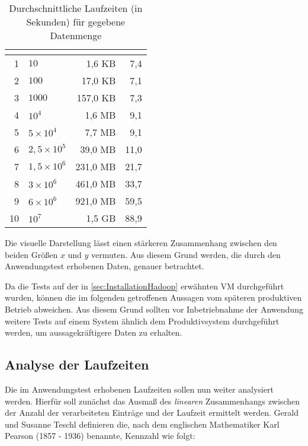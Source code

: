 \begin{table}
	\centering
	\begin{tabular}{| r | l | r | r |}
		\hline
		\rowcolor[HTML]{3531FF} 
		\multicolumn{1}{|l|}{\cellcolor[HTML]{4F88BB}{\color[HTML]{FFFFFF} {\bf \#}}} & \multicolumn{1}{l|}{\cellcolor[HTML]{4F88BB}{\color[HTML]{FFFFFF} {\bf Anzahl Einträge}}} & \multicolumn{1}{l|}{\cellcolor[HTML]{4F88BB}{\color[HTML]{FFFFFF} {\bf Dateigröße}}} & \multicolumn{1}{l|}{\cellcolor[HTML]{4F88BB}{\color[HTML]{FFFFFF} {\bf Laufzeit}}} \\ \hline
		1 & $10$ & 1,6 \ac{KB} & 7,4 \\  \hline
		2 & $100$ & 17,0 \ac{KB} & 7,1 \\ \hline
		3 & $1000$ & 157,0 \ac{KB} & 7,3 \\  \hline \hline
		4 & $10^4$ & 1,6 \ac{MB} & 9,1 \\  \hline
		5 & $5\times10^4$ & 7,7 \ac{MB} & 9,1 \\  \hline
		6 & $2,5\times10^5$ & 39,0 \ac{MB} & 11,0 \\  \hline
		7 & $1,5\times10^6$ & 231,0 \ac{MB} & 21,7 \\  \hline
		8 & $3\times10^6$ & 461,0 \ac{MB} & 33,7 \\  \hline
		9 & $6\times10^6$ & 921,0 \ac{MB} & 59,5 \\  \hline \hline
		10 & $10^7$ & 1,5 \ac{GB} & 88,9 \\  \hline
	\end{tabular}
	\caption{Durchschnittliche Laufzeiten (in Sekunden) für gegebene Datenmenge}
	\label{tbl:DurchschnittlicheLaufzeiten}
\end{table}

Die visuelle Darstellung lässt einen stärkeren Zusammenhang zwischen den beiden Größen $x$ und $y$ vermuten. Aus diesem Grund werden, die durch den Anwendungstest erhobenen Daten, genauer betrachtet.

Da die Tests auf der in \autoref{sec:InstallationHadoop} erwähnten \ac{VM} durchgeführt wurden, können die im folgenden getroffenen Aussagen vom späteren produktiven Betrieb abweichen. Aus diesem Grund sollten vor Inbetriebnahme der Anwendung weitere Tests auf einem System ähnlich dem Produktivsystem durchgeführt werden, um aussagekräftigere Daten zu erhalten.

\subsection{Analyse der Laufzeiten}\label{subsec:Laufzeitanalyse}
Die im Anwendungstest erhobenen Laufzeiten sollen nun weiter analysiert werden. Hierfür soll zunächst das Ausmaß des \textit{linearen} Zusammenhangs zwischen der Anzahl der verarbeiteten Einträge und der Laufzeit ermittelt werden. Gerald und Susanne Teschl definieren die, nach dem englischen Mathematiker Karl Pearson (1857 - 1936) benannte, Kennzahl wie folgt:

